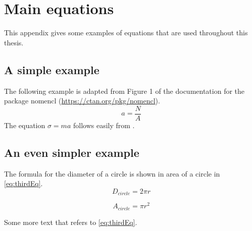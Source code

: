 \documentclass[
english,                 %
bibtex,                  %
includeExtraAbstracts, %
]{kththesis}
\numberwithin{listing}{chapter}
\begin{document}
\ifnomenclature
    \cleardoublepage
    \chapter{Main equations}
    \label{ch:NomenclatureExamples}
    This appendix gives some examples of equations that are used throughout this thesis.
    \section{A simple example}
    The following example is adapted from Figure 1 of the documentation for the package nomencl (\url{https://ctan.org/pkg/nomencl}).
    \begin{equation}\label{eq:mainEq}
    a=\frac{N}{A}
    \end{equation}
    The equation $\sigma = m a$%
follows easily from .

    \section{An even simpler example}
    The formula for the diameter of a circle is shown in  area of a circle in \cref{eq:thirdEq}.
    \begin{equation}\label{eq:secondEq}
    D_{circle}=2\pi r
    \end{equation}

    \begin{equation}\label{eq:thirdEq}
    A_{circle}=\pi r^2
    \end{equation}

    Some more text that refers to \eqref{eq:thirdEq}.
\fi  %

\cleardoublepage
%
\end{document}
